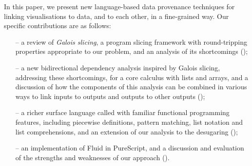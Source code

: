 In this paper, we present new language-based data provenance techniques for linking visualisations to data, and to each other, in a fine-grained way. Our specific contributions are as follows:

\begin{itemize}[leftmargin=*]
   \item[--] a review of \emph{Galois slicing}, a program slicing framework with round-tripping properties appropriate to our problem, and an analysis of its shortcomings ();
   \item[--] a new bidirectional dependency analysis inspired by Galois slicing, addressing these shortcomings, for a core calculus with lists and arrays, and a discussion of how the components of this analysis can be combined in various ways to link inputs to outputs and outputs to other outputs ();
   \item[--] a richer surface language called \OurLanguage with familiar functional programming features, including piecewise definitions, pattern matching, list notation and list comprehensions, and an extension of our analysis to the desugaring ();
   \item[--] an implementation of Fluid in PureScript, and a discussion and evaluation of the strengths and weaknesses of our approach ().
\end{itemize}
